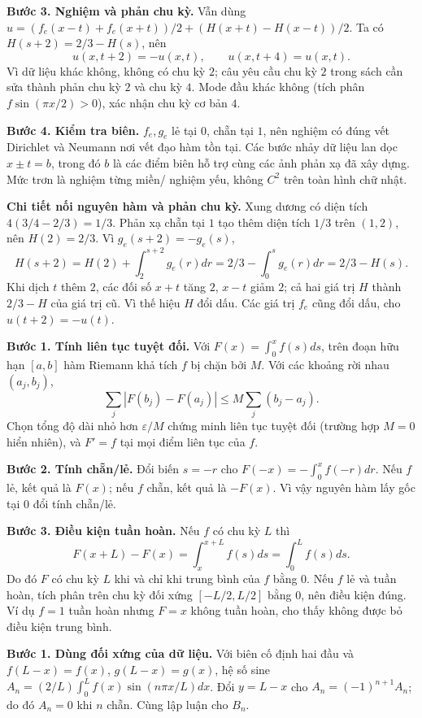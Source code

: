 \textbf{Bước 3. Nghiệm và phản chu kỳ.} Vẫn dùng $u=(f_e(x-t)+f_e(x+t))/2+(H(x+t)-H(x-t))/2$. Ta có $H(s+2)=2/3-H(s)$, nên
\[u(x,t+2)=-u(x,t),\qquad u(x,t+4)=u(x,t).\]
Vì dữ liệu khác không, không có chu kỳ $2$; câu yêu cầu chu kỳ $2$ trong sách cần sửa thành phản chu kỳ $2$ và chu kỳ $4$. Mode đầu khác không (tích phân $f\sin(\pi x/2)>0$), xác nhận chu kỳ cơ bản $4$.

\textbf{Bước 4. Kiểm tra biên.} $f_e,g_e$ lẻ tại $0$, chẵn tại $1$, nên nghiệm có đúng vết Dirichlet và Neumann nơi vết đạo hàm tồn tại. Các bước nhảy dữ liệu lan dọc $x\pm t=b$, trong đó $b$ là các điểm biên hỗ trợ cùng các ảnh phản xạ đã xây dựng. Mức trơn là nghiệm từng miền/ nghiệm yếu, không $C^2$ trên toàn hình chữ nhật.

\textbf{Chi tiết nối nguyên hàm và phản chu kỳ.} Xung dương có diện tích $4(3/4-2/3)=1/3$. Phản xạ chẵn tại $1$ tạo thêm diện tích $1/3$ trên $(1,2)$, nên $H(2)=2/3$. Vì $g_e(s+2)=-g_e(s)$,
\[H(s+2)=H(2)+\int_2^{s+2}g_e(r)dr=2/3-\int_0^sg_e(r)dr=2/3-H(s).\]
Khi dịch $t$ thêm $2$, các đối số $x+t$ tăng $2$, $x-t$ giảm $2$; cả hai giá trị $H$ thành $2/3-H$ của giá trị cũ. Vì thế hiệu $H$ đổi dấu. Các giá trị $f_e$ cũng đổi dấu, cho $u(t+2)=-u(t)$.

\textbf{Bước 1. Tính liên tục tuyệt đối.} Với $F(x)=\int_0^xf(s)ds$, trên đoạn hữu hạn $[a,b]$ hàm Riemann khả tích $f$ bị chặn bởi $M$. Với các khoảng rời nhau $(a_j,b_j)$,
\[\sum_j|F(b_j)-F(a_j)|\le M\sum_j(b_j-a_j).\]
Chọn tổng độ dài nhỏ hơn $\varepsilon/M$ chứng minh liên tục tuyệt đối (trường hợp $M=0$ hiển nhiên), và $F'=f$ tại mọi điểm liên tục của $f$.

\textbf{Bước 2. Tính chẵn/lẻ.} Đổi biến $s=-r$ cho $F(-x)=-\int_0^xf(-r)dr$. Nếu $f$ lẻ, kết quả là $F(x)$; nếu $f$ chẵn, kết quả là $-F(x)$. Vì vậy nguyên hàm lấy gốc tại $0$ đổi tính chẵn/lẻ.

\textbf{Bước 3. Điều kiện tuần hoàn.} Nếu $f$ có chu kỳ $L$ thì
\[F(x+L)-F(x)=\int_x^{x+L}f(s)ds=\int_0^Lf(s)ds.\]
Do đó $F$ có chu kỳ $L$ khi và chỉ khi trung bình của $f$ bằng $0$. Nếu $f$ lẻ và tuần hoàn, tích phân trên chu kỳ đối xứng $[-L/2,L/2]$ bằng $0$, nên điều kiện đúng. Ví dụ $f=1$ tuần hoàn nhưng $F=x$ không tuần hoàn, cho thấy không được bỏ điều kiện trung bình.

\textbf{Bước 1. Dùng đối xứng của dữ liệu.} Với biên cố định hai đầu và $f(L-x)=f(x)$, $g(L-x)=g(x)$, hệ số sine $A_n=(2/L)\int_0^Lf(x)\sin(n\pi x/L)dx$. Đổi $y=L-x$ cho $A_n=(-1)^{n+1}A_n$; do đó $A_n=0$ khi $n$ chẵn. Cùng lập luận cho $B_n$.


